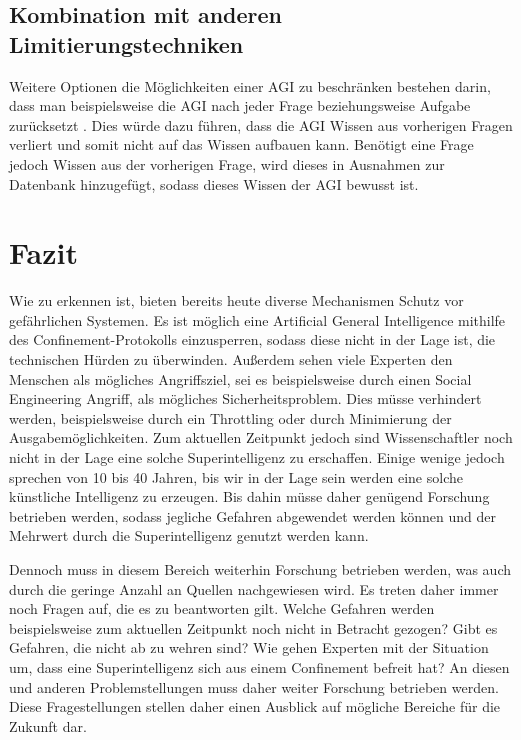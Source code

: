         \subsection{Kombination mit anderen Limitierungstechniken}
        Weitere Optionen die Möglichkeiten einer AGI zu beschränken bestehen darin, dass man beispielsweise die
        AGI nach jeder Frage beziehungsweise Aufgabe zurücksetzt \cite[s. 309]{armstrongforthcoming}. Dies würde dazu
        führen, dass die AGI Wissen aus vorherigen Fragen verliert und somit nicht auf das Wissen aufbauen kann.
        Benötigt eine Frage jedoch Wissen aus der vorherigen Frage, wird dieses in Ausnahmen zur Datenbank hinzugefügt,
        sodass dieses Wissen der AGI bewusst ist.

    \section{Fazit}
        Wie zu erkennen ist, bieten bereits heute diverse Mechanismen Schutz vor gefährlichen Systemen. Es ist möglich
        eine Artificial General Intelligence mithilfe des Confinement-Protokolls einzusperren, sodass diese nicht in der
        Lage ist, die technischen Hürden zu überwinden. Außerdem sehen viele Experten den Menschen als mögliches Angriffsziel,
        sei es beispielsweise durch einen Social Engineering Angriff, als mögliches Sicherheitsproblem. Dies müsse
        verhindert werden, beispielsweise durch ein Throttling oder durch Minimierung der Ausgabemöglichkeiten. Zum
        aktuellen Zeitpunkt jedoch sind Wissenschaftler noch nicht in der Lage eine solche Superintelligenz zu erschaffen.
        Einige wenige jedoch sprechen von 10 bis 40 Jahren, bis wir in der Lage sein werden eine solche künstliche
        Intelligenz zu erzeugen. Bis dahin müsse daher genügend Forschung betrieben werden, sodass jegliche Gefahren
        abgewendet werden können und der Mehrwert durch die Superintelligenz genutzt werden kann.

        Dennoch muss in diesem Bereich weiterhin Forschung betrieben werden, was auch durch die geringe Anzahl an Quellen
        nachgewiesen wird. Es treten daher immer noch Fragen auf, die es zu beantworten gilt. Welche Gefahren werden
        beispielsweise zum aktuellen Zeitpunkt noch nicht in Betracht gezogen? Gibt es Gefahren, die nicht ab zu wehren
        sind? Wie gehen Experten mit der Situation um, dass eine Superintelligenz sich aus einem Confinement befreit hat?
        An diesen und anderen Problemstellungen muss daher weiter Forschung betrieben werden. Diese Fragestellungen stellen
        daher einen Ausblick auf mögliche Bereiche für die Zukunft dar.

    \newpage
    
    

